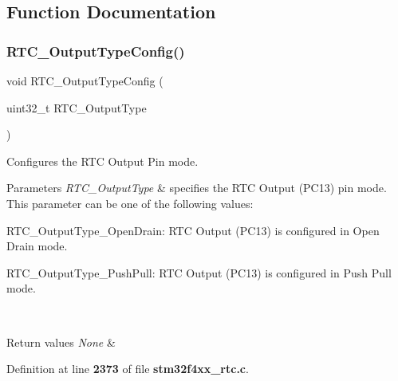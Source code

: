\subsection{Function Documentation}
\mbox{\label{group__RTC__Group11_ga95263b7acf7168d52f66ef9121f14760}} 
\subsubsection{R\+T\+C\+\_\+\+Output\+Type\+Config()}
{\footnotesize\ttfamily void R\+T\+C\+\_\+\+Output\+Type\+Config (\begin{DoxyParamCaption}\item[{uint32\+\_\+t}]{R\+T\+C\+\_\+\+Output\+Type }\end{DoxyParamCaption})}



Configures the R\+TC Output Pin mode. 


\begin{DoxyParams}{Parameters}
{\em R\+T\+C\+\_\+\+Output\+Type} & specifies the R\+TC Output (P\+C13) pin mode. This parameter can be one of the following values\+: \begin{DoxyItemize}
\item R\+T\+C\+\_\+\+Output\+Type\+\_\+\+Open\+Drain\+: R\+TC Output (P\+C13) is configured in Open Drain mode. \item R\+T\+C\+\_\+\+Output\+Type\+\_\+\+Push\+Pull\+: R\+TC Output (P\+C13) is configured in Push Pull mode. \end{DoxyItemize}
\\
\hline
\end{DoxyParams}

\begin{DoxyRetVals}{Return values}
{\em None} & \\
\hline
\end{DoxyRetVals}


Definition at line \textbf{ 2373} of file \textbf{ stm32f4xx\+\_\+rtc.\+c}.


